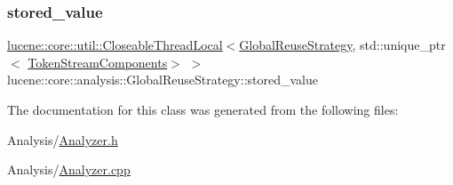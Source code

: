\subsubsection{\texorpdfstring{stored\+\_\+value}{stored\_value}}
{\footnotesize\ttfamily \mbox{\hyperlink{classlucene_1_1core_1_1util_1_1CloseableThreadLocal}{lucene\+::core\+::util\+::\+Closeable\+Thread\+Local}}$<$\mbox{\hyperlink{classlucene_1_1core_1_1analysis_1_1GlobalReuseStrategy}{Global\+Reuse\+Strategy}}, std\+::unique\+\_\+ptr$<$ \mbox{\hyperlink{classlucene_1_1core_1_1analysis_1_1TokenStreamComponents}{Token\+Stream\+Components}}$>$ $>$ lucene\+::core\+::analysis\+::\+Global\+Reuse\+Strategy\+::stored\+\_\+value\hspace{0.3cm}{\ttfamily [private]}}



The documentation for this class was generated from the following files\+:\begin{DoxyCompactItemize}
\item 
Analysis/\mbox{\hyperlink{Analyzer_8h}{Analyzer.\+h}}\item 
Analysis/\mbox{\hyperlink{Analyzer_8cpp}{Analyzer.\+cpp}}\end{DoxyCompactItemize}
